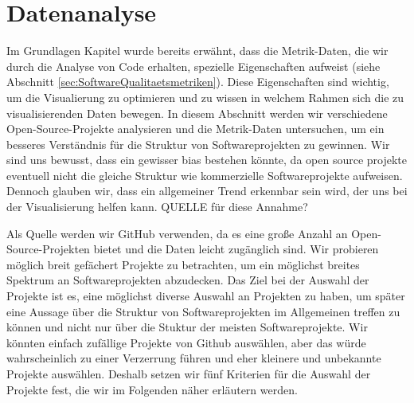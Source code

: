 \section{Datenanalyse} \label{sec:datenAnalyse}

Im Grundlagen Kapitel wurde bereits erwähnt, dass die Metrik-Daten, die wir durch die Analyse von Code erhalten, spezielle Eigenschaften aufweist (siehe Abschnitt \ref{sec:SoftwareQualitaetsmetriken}). Diese Eigenschaften sind wichtig, um die Visualierung zu optimieren und zu wissen in welchem Rahmen sich die zu visualisierenden Daten bewegen. 
In diesem Abschnitt werden wir verschiedene Open-Source-Projekte analysieren und die Metrik-Daten untersuchen, um ein besseres Verständnis für die Struktur von Softwareprojekten zu gewinnen. 
Wir sind uns bewusst, dass ein gewisser bias bestehen könnte, da open source projekte eventuell nicht die gleiche Struktur wie kommerzielle Softwareprojekte aufweisen. Dennoch glauben wir, dass ein allgemeiner Trend erkennbar sein wird, der uns bei der Visualisierung helfen kann. QUELLE für diese Annahme?

Als Quelle werden wir GitHub verwenden, da es eine große Anzahl an Open-Source-Projekten bietet und die Daten leicht zugänglich sind.
Wir probieren möglich breit gefächert Projekte zu betrachten, um ein möglichst breites Spektrum an Softwareprojekten abzudecken. 
Das Ziel bei der Auswahl der Projekte ist es, eine möglichst diverse Auswahl an Projekten zu haben, um später eine Aussage über die Struktur von Softwareprojekten im Allgemeinen treffen zu können und nicht nur über die Stuktur der meisten Softwareprojekte. Wir könnten einfach zufällige Projekte von Github auswählen, aber das würde wahrscheinlich zu einer Verzerrung führen und eher kleinere und unbekannte Projekte auswählen.
Deshalb setzen wir fünf Kriterien für die Auswahl der Projekte fest, die wir im Folgenden näher erläutern werden.

